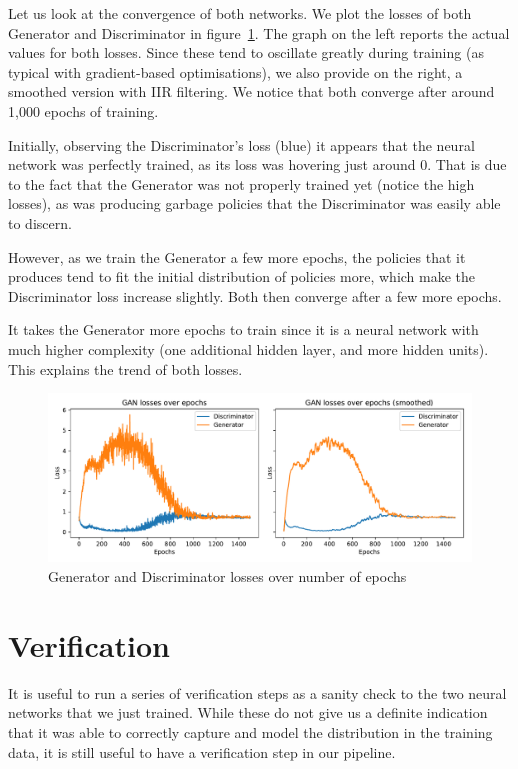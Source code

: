 Let us look at the convergence of both networks. We plot the losses of both Generator and Discriminator in figure~\ref{fig:GANLosses}. The graph on the left reports the actual values for both losses. Since these tend to oscillate greatly during training (as typical with gradient-based optimisations), we also provide on the right, a smoothed version with IIR filtering. We notice that both  converge after around 1,000 epochs of training.

Initially, observing the Discriminator's loss (blue) it appears that the neural network was perfectly trained, as its loss was hovering just around 0. That is due to the fact that the Generator was not properly trained yet (notice the high losses), as was producing garbage policies that the Discriminator was easily able to discern.

However, as we train the Generator a few more epochs, the policies that it produces tend to fit the initial distribution of policies more, which make the Discriminator loss increase slightly. Both then converge after a few more epochs.

It takes the Generator more epochs to train since it is a neural network with much higher complexity (one additional hidden layer, and more hidden units). This explains the trend of both losses.

\begin{figure}
\centering
\includegraphics[width=15cm]{Figures/GAN_losses}
\caption{Generator and Discriminator losses over number of epochs}
\label{fig:GANLosses}
\end{figure}



\section{Verification}
It is useful to run a series of verification steps as a sanity check to the two neural networks that we just trained. While these do not give us a definite indication that it was able to correctly capture and model the distribution in the training data, it is still useful to have a verification step in our pipeline.

